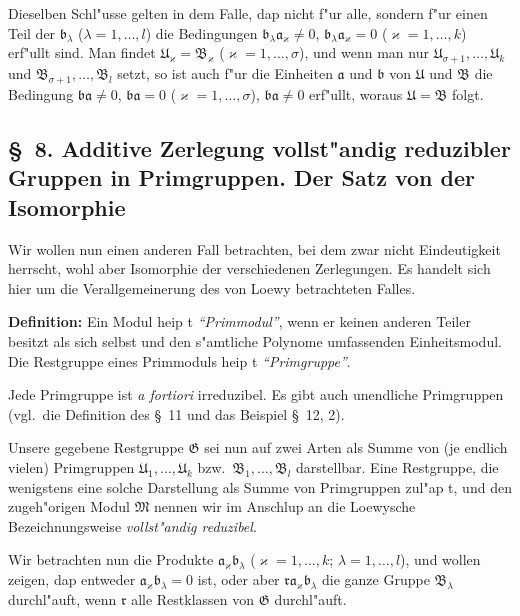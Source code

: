 \documentclass[12pt,a4paper]{article}
\begin{document}
Dieselben Schl"usse gelten in dem Falle, dap nicht f"ur alle, sondern f"ur einen Teil der $\mathfrak{b}_\lambda$ ($\lambda=1,\ldots,l$) die Bedingungen $\mathfrak{b}_\lambda\mathfrak{a}_\varkappa \neq 0$, $\mathfrak{b}_\lambda\mathfrak{a}_\varkappa = 0$ ($\varkappa=1,\ldots,k$) erf"ullt sind. Man findet $\mathfrak{U}_\varkappa = \mathfrak{B}_\varkappa$ ($\varkappa=1,\ldots,\sigma$), und wenn man nur $\mathfrak{U}_{\sigma+1},\ldots,\mathfrak{U}_k$ und $\mathfrak{B}_{\sigma+1},\ldots,\mathfrak{B}_l$ setzt, so ist auch f"ur die Einheiten $\mathfrak{a}$ und $\mathfrak{b}$ von $\mathfrak{U}$ und $\mathfrak{B}$ die Bedingung $\mathfrak{b}\mathfrak{a} \neq 0$, $\mathfrak{b}\mathfrak{a} = 0$ ($\varkappa=1,\ldots,\sigma$), $\mathfrak{b}\mathfrak{a} \neq 0$ erf"ullt, woraus $\mathfrak{U} = \mathfrak{B}$ folgt.

\subsection*{\S\ 8. Additive Zerlegung vollst"andig reduzibler Gruppen in Primgruppen. Der Satz von der Isomorphie}

Wir wollen nun einen anderen Fall betrachten, bei dem zwar nicht Eindeutigkeit herrscht, wohl aber Isomorphie der verschiedenen Zerlegungen. Es handelt sich hier um die Verallgemeinerung des von Loewy betrachteten Falles.

\textbf{Definition:} Ein Modul heip t \emph{``Primmodul''}, wenn er keinen anderen Teiler besitzt als sich selbst und den s"amtliche Polynome umfassenden Einheitsmodul. Die Restgruppe eines Primmoduls heip t \emph{``Primgruppe''}.

Jede Primgruppe ist \emph{a fortiori} irreduzibel. Es gibt auch unendliche Primgruppen (vgl.\ die Definition des \S\ 11 und das Beispiel \S\ 12, 2).

Unsere gegebene Restgruppe $\mathfrak{G}$ sei nun auf zwei Arten als Summe von (je endlich vielen) Primgruppen $\mathfrak{U}_1,\ldots,\mathfrak{U}_k$ bzw.\ $\mathfrak{B}_1,\ldots,\mathfrak{B}_l$ darstellbar. Eine Restgruppe, die wenigstens eine solche Darstellung als Summe von Primgruppen zul"ap t, und den zugeh"origen Modul $\mathfrak{M}$ nennen wir im Anschlup an die Loewysche Bezeichnungsweise \emph{vollst"andig reduzibel}.

Wir betrachten nun die Produkte $\mathfrak{a}_\varkappa\mathfrak{b}_\lambda$ ($\varkappa=1,\ldots,k$; $\lambda=1,\ldots,l$), und wollen zeigen, dap entweder $\mathfrak{a}_\varkappa\mathfrak{b}_\lambda = 0$ ist, oder aber $\mathfrak{r}\mathfrak{a}_\varkappa\mathfrak{b}_\lambda$ die ganze Gruppe $\mathfrak{B}_\lambda$ durchl"auft, wenn $\mathfrak{r}$ alle Restklassen von $\mathfrak{G}$ durchl"auft.
\end{document}
